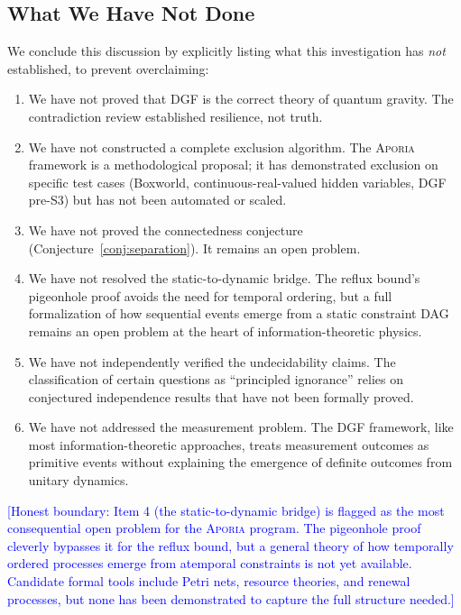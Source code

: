 \documentclass[12pt,a4paper]{article}
\theoremstyle{definition}
\theoremstyle{remark}
\newcommand{\Aporia}{\textsc{Aporia}}
\newcommand{\honest}[1]{\textcolor{blue}{\small [Honest boundary: #1]}}
\begin{document}
\subsection{What We Have Not Done}

We conclude this discussion by explicitly listing what this investigation has \emph{not} established, to prevent overclaiming:

\begin{enumerate}[leftmargin=*,itemsep=0pt,topsep=0pt]
\item We have not proved that DGF is the correct theory of quantum gravity. The contradiction review established resilience, not truth.
\item We have not constructed a complete exclusion algorithm. The \Aporia{} framework is a methodological proposal; it has demonstrated exclusion on specific test cases (Boxworld, continuous-real-valued hidden variables, DGF pre-S3) but has not been automated or scaled.
\item We have not proved the connectedness conjecture (Conjecture~\ref{conj:separation}). It remains an open problem.
\item We have not resolved the static-to-dynamic bridge. The reflux bound's pigeonhole proof avoids the need for temporal ordering, but a full formalization of how sequential events emerge from a static constraint DAG remains an open problem at the heart of information-theoretic physics.
\item We have not independently verified the undecidability claims. The classification of certain questions as ``principled ignorance'' relies on conjectured independence results that have not been formally proved.
\item We have not addressed the measurement problem. The DGF framework, like most information-theoretic approaches, treats measurement outcomes as primitive events without explaining the emergence of definite outcomes from unitary dynamics.
\end{enumerate}

\honest{Item 4 (the static-to-dynamic bridge) is flagged as the most consequential open problem for the \Aporia{} program. The pigeonhole proof cleverly bypasses it for the reflux bound, but a general theory of how temporally ordered processes emerge from atemporal constraints is not yet available. Candidate formal tools include Petri nets, resource theories, and renewal processes, but none has been demonstrated to capture the full structure needed.}
\end{document}
